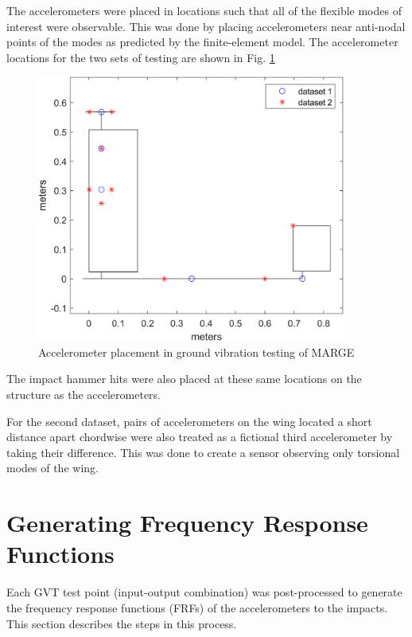 The accelerometers were placed in locations such that all of the flexible modes of interest were observable. This was done by placing accelerometers near anti-nodal points of the modes as predicted by the finite-element model. The accelerometer locations for the two sets of testing are shown in Fig. \ref{fig:accelPlacement}

\begin{figure}[h]
    \centering
    \includegraphics[width=4in]{figs/GVT/accelLocPlot.png}
    \caption{Accelerometer placement in ground vibration testing of MARGE}
    \label{fig:accelPlacement}
\end{figure}

The impact hammer hits were also placed at these same locations on the structure as the accelerometers.

For the second dataset, pairs of accelerometers on the wing located a short distance apart chordwise were also treated as a fictional third accelerometer by taking their difference. This was done to create a sensor observing only torsional modes of the wing.

\section{Generating Frequency Response Functions} %

Each GVT test point (input-output combination) was post-processed to generate the frequency response functions (FRFs) of the accelerometers to the impacts. This section describes the steps in this process.

